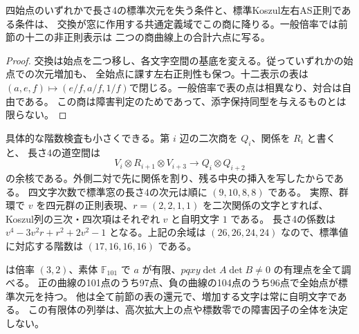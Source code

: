 \begin{corollary}
四始点のいずれかで長さ4の標準次元を失う条件と、標準Koszul左右AS正則である条件は、
交換が窓に作用する共通定義域でこの商に降りる。一般倍率では前節の十二の非正則表示は
二つの商曲線上の合計六点に写る。
\end{corollary}
\begin{proof}
交換は始点を二つ移し、各文字空間の基底を変える。従っていずれかの始点での次元増加も、
全始点に課す左右正則性も保つ。十二表示の表は
$(a,e,f)\mapsto(e/f,a/f,1/f)$で閉じる。一般倍率で表の点は相異なり、対合は自由である。
この商は障害判定のためであって、添字保持同型を与えるものとは限らない。
\end{proof}

具体的な階数検査も小さくできる。第 $i$ 辺の二次商を $Q_i$、関係を $R_i$ と書くと、
長さ4の道空間は
\[
 V_i\otimes R_{i+1}\otimes V_{i+3}\longrightarrow Q_i\otimes Q_{i+2}
\]
の余核である。外側二対で先に関係を割り、残る中央の挿入を写したからである。
四文字次数で標準窓の長さ4の次元は順に $(9,10,8,8)$ である。
実際、群環で $v$ を四元群の正則表現、$r=(2,2,1,1)$ を二次関係の文字とすれば、
Koszul列の三次・四次項はそれぞれ $v$ と自明文字 $1$ である。
長さ4の係数は $v^4-3v^2r+r^2+2v^2-1$ となる。上記の余域は
$(26,26,24,24)$ なので、標準値に対応する階数は $(17,16,16,16)$ である。

 は倍率 $(3,2)$、素体
$\mathbb F_{101}$ で $a$ が有限、$pqxy\det A\det B\ne0$ の有理点を全て調べる。
正の曲線の101点のうち97点、負の曲線の104点のうち96点で全始点が標準次元を持つ。
他は全て前節の表の還元で、増加する文字は常に自明文字である。
この有限体の列挙は、高次拡大上の点や標数零での障害因子の全体を決定しない。
